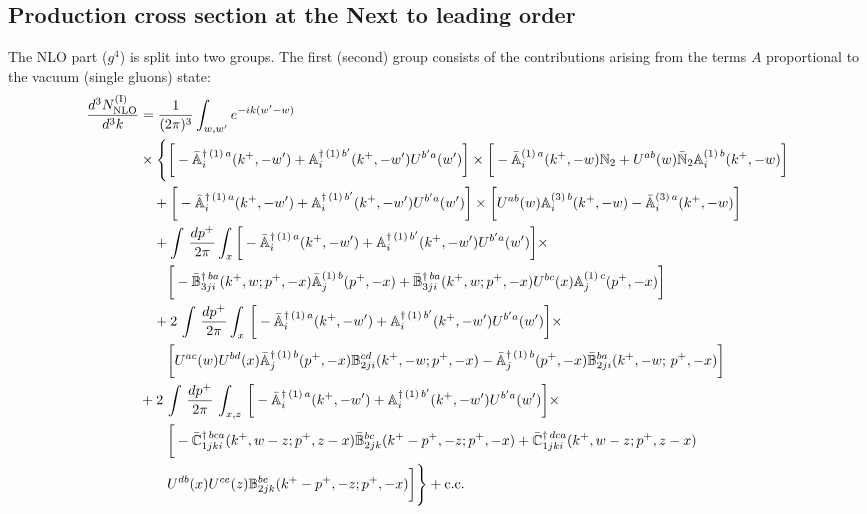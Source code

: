 \documentclass[aps,prd,amsmath,amssymb,nofootinbib]{revtex4-2}
\def\mf#1{\mathbb{#1}}
\numberwithin{equation}{section}
\begin{document}
\subsection{Production cross section at the Next to leading order}
The NLO part ($g^4$) is split into two groups. The first (second) group consists
of the contributions arising from the terms $A$ proportional to the vacuum (single gluons) state: 
\begin{align} \label{eq:CS1}
    \frac{d^{3}N_{\rm NLO}^{\rm (I)}}{d^{3}k} & =
    \frac{1}{(2\pi)^{3}}  \int_{w, w^\prime} e^{-ik(w^\prime-w)}
    \notag \\ & \times \Bigg\{\bigg[-\bar{\mf{A}}^{\dagger\,(1)\,a}_{i}(k^{+},-w^{\prime})+\mf{A}^{\dagger\, (1)\, b^{\prime}}_{i}(k^{+},-w^{\prime})U^{b^{\prime}a}(w^{\prime})\bigg]\times\bigg[-\bar{\mf{A}}^{(1)\,a}_{i}(k^{+},-w)\mf{N}_{2}+ U^{ab}(w)\bar{\mf{N}}_{2}\mf{A}^{(1)\, b}_{i}(k^{+},-w)\bigg]\notag \\ & \quad +\bigg[-\bar{\mf{A}}^{\dagger\,(1)\,a}_{i}(k^{+},-w^{\prime})+\mf{A}^{\dagger\, (1)\, b^{\prime}}_{i}(k^{+},-w^{\prime})U^{b^{\prime}a}(w^{\prime})\bigg]\times\bigg[U^{ab}(w)\mf{A}^{(3)\, b}_{i}(k^{+},- w)-\Bar{\mf{A}}^{(3)\, a}_{i}(k^{+}, - w)\bigg]\notag \\ & \quad +\int\,\frac{dp^{+}}{2\pi} \int_{x} \bigg[-\bar{\mf{A}}^{\dagger\,(1)\,a}_{i}(k^{+},-w^{\prime})+\mf{A}^{\dagger\, (1)\, b^{\prime}}_{i}(k^{+},-w^{\prime})U^{b^{\prime}a}(w^{\prime})\bigg]\times\notag \\ & \quad \quad \bigg[-\Bar{\mf{B}}^{\dagger\, ba}_{3ji}(k^{+}, w; p^{+}, -x)\Bar{\mf{A}}^{(1)\,b}_{j}(p^{+}, - x)
         + \Bar{\mf{B}}^{\dagger\, ba}_{3ji}(k^{+},w; p^{+},-x) U^{bc}(x) \mf{A}^{(1)\, c}_{j}(p^{+},- x)\bigg]\notag \\ & \quad  +2\, \int\,\frac{dp^{+}}{2\pi} \int_{x}\,\bigg[-\bar{\mf{A}}^{\dagger\,(1)\,a}_{i}(k^{+},-w^{\prime})+\mf{A}^{\dagger\, (1)\, b^{\prime}}_{i}(k^{+},-w^{\prime})U^{b^{\prime}a}(w^{\prime})\bigg]\times \notag \\ & \quad \quad \bigg[U^{ac}(w)U^{bd}(x) \bar{\mf{A}}^{\dagger\, (1)\, b}_{j}(p^+,- x) {\mf{B}}^{cd}_{2ji} (k^+, -w;p^+, -x) - \Bar{\mf{A}}^{\dagger\, (1)\, b}_{j}(p^{+}, -x)\Bar{\mf{B}}^{ba}_{2ji}(k^{+},-w;\,p^{+}, -x) \bigg] \notag \\ &+  2\, \int\, \frac{dp^{+}}{2\pi}\,\int_{x,z}\, \bigg[-\bar{\mf{A}}^{\dagger\,(1)\,a}_{i}(k^{+},-w^{\prime})+\mf{A}^{\dagger\, (1)\, b^{\prime}}_{i}(k^{+},-w^{\prime})U^{b^{\prime}a}(w^{\prime})\bigg]\times\notag \\ & \quad \quad \bigg[-\Bar{\mf{C}}^{\dagger\, bca}_{1jki}(k^{+},w-z;p^{+},z-x)\Bar{\mf{B}}^{bc}_{2jk}(k^{+}-p^{+},- z;p^{+},-x)
           +\bar{\mf{C}}^{\dagger\, dca}_{1jki}(k^+,w-z; p^+, z-x)  \notag \\ &\quad \quad
                 U^{db}(x)
                 U^{ce}(z) 
                {\mf{B}}^{be}_{2jk} (k^{+}-p^+, -z; p^+, -x) \bigg]  \Bigg\}+ {\rm c.c.}
\end{align}
\end{document}
